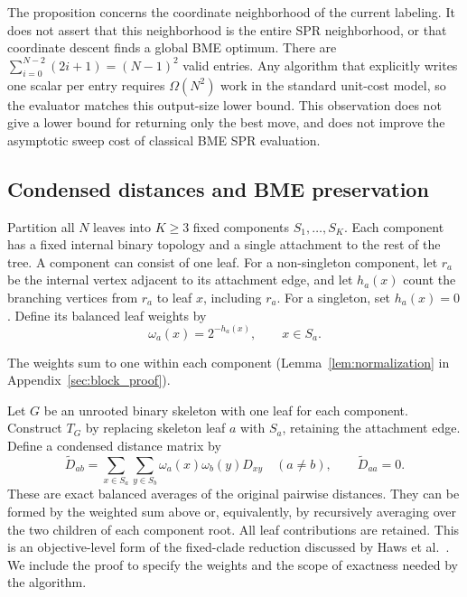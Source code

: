\documentclass[11pt,a4paper]{article}
\makeatletter
\DeclareRobustCommand{\_}{\ifmmode\nfss@text{\textunderscore}\else\textunderscore\allowbreak\fi}
\theoremstyle{definition}
\makeatother
\begin{document}
The proposition concerns the coordinate neighborhood of the current labeling.
It does not assert that this neighborhood is the entire SPR neighborhood, or that coordinate descent finds a global BME optimum.
There are $\sum_{i=0}^{N-2}(2i+1)=(N-1)^2$ valid entries.
Any algorithm that explicitly writes one scalar per entry requires $\Omega(N^2)$ work in the standard unit-cost model, so the evaluator matches this output-size lower bound.
This observation does not give a lower bound for returning only the best move, and does not improve the asymptotic sweep cost of classical BME SPR evaluation.

\subsection{Condensed distances and BME preservation}
\label{sec:condensation}

Partition all $N$ leaves into $K\geq3$ fixed components $S_1,\ldots,S_K$.
Each component has a fixed internal binary topology and a single attachment to the rest of the tree.
A component can consist of one leaf.
For a non-singleton component, let $r_a$ be the internal vertex adjacent to its attachment edge, and let $h_a(x)$ count the branching vertices from $r_a$ to leaf $x$, including $r_a$.
For a singleton, set $h_a(x)=0$.
Define its balanced leaf weights by
\begin{equation}
 \omega_a(x)=2^{-h_a(x)},\qquad x\in S_a.
 \label{eq:profile}
\end{equation}

The weights sum to one within each component (Lemma~\ref{lem:normalization} in Appendix~\ref{sec:block_proof}).

Let $G$ be an unrooted binary skeleton with one leaf for each component.
Construct $T_G$ by replacing skeleton leaf $a$ with $S_a$, retaining the attachment edge.
Define a condensed distance matrix by
\begin{equation}
 \widetilde D_{ab}
 =\sum_{x\in S_a}\sum_{y\in S_b}
    \omega_a(x)\omega_b(y)D_{xy}\quad(a\ne b),
 \qquad \widetilde D_{aa}=0.
 \label{eq:condensed_D}
\end{equation}
These are exact balanced averages of the original pairwise distances.
They can be formed by the weighted sum above or, equivalently, by recursively averaging over the two children of each component root.
All leaf contributions are retained.
This is an objective-level form of the fixed-clade reduction discussed by Haws et al.~\cite[Section~2.4]{haws2011optimality}.
We include the proof to specify the weights and the scope of exactness needed by the algorithm.
\end{document}
